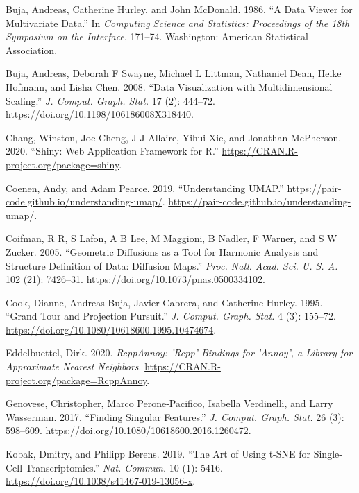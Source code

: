 \documentclass[article,notitle]{jdssv}
\begin{document}
\leavevmode\hypertarget{ref-Buja1986-ku}{}%
Buja, Andreas, Catherine Hurley, and John McDonald. 1986. ``A Data Viewer for Multivariate Data.'' In \emph{Computing Science and Statistics: Proceedings of the 18th Symposium on the Interface}, 171--74. Washington: American Statistical Association.

\leavevmode\hypertarget{ref-Buja2008-fn}{}%
Buja, Andreas, Deborah F Swayne, Michael L Littman, Nathaniel Dean, Heike Hofmann, and Lisha Chen. 2008. ``Data Visualization with Multidimensional Scaling.'' \emph{J. Comput. Graph. Stat.} 17 (2): 444--72. \url{https://doi.org/10.1198/106186008X318440}.

\leavevmode\hypertarget{ref-Chang2020-bq}{}%
Chang, Winston, Joe Cheng, J J Allaire, Yihui Xie, and Jonathan McPherson. 2020. ``Shiny: Web Application Framework for R.'' \url{https://CRAN.R-project.org/package=shiny}.

\leavevmode\hypertarget{ref-Coenen2019-to}{}%
Coenen, Andy, and Adam Pearce. 2019. ``Understanding UMAP.'' \url{https://pair-code.github.io/understanding-umap/}. \url{https://pair-code.github.io/understanding-umap/}.

\leavevmode\hypertarget{ref-Coifman2005-ak}{}%
Coifman, R R, S Lafon, A B Lee, M Maggioni, B Nadler, F Warner, and S W Zucker. 2005. ``Geometric Diffusions as a Tool for Harmonic Analysis and Structure Definition of Data: Diffusion Maps.'' \emph{Proc. Natl. Acad. Sci. U. S. A.} 102 (21): 7426--31. \url{https://doi.org/10.1073/pnas.0500334102}.

\leavevmode\hypertarget{ref-Cook1995-bi}{}%
Cook, Dianne, Andreas Buja, Javier Cabrera, and Catherine Hurley. 1995. ``Grand Tour and Projection Pursuit.'' \emph{J. Comput. Graph. Stat.} 4 (3): 155--72. \url{https://doi.org/10.1080/10618600.1995.10474674}.

\leavevmode\hypertarget{ref-rcpp-annoy-pkg}{}%
Eddelbuettel, Dirk. 2020. \emph{RcppAnnoy: 'Rcpp' Bindings for 'Annoy', a Library for Approximate Nearest Neighbors}. \url{https://CRAN.R-project.org/package=RcppAnnoy}.

\leavevmode\hypertarget{ref-Genovese2017-iq}{}%
Genovese, Christopher, Marco Perone-Pacifico, Isabella Verdinelli, and Larry Wasserman. 2017. ``Finding Singular Features.'' \emph{J. Comput. Graph. Stat.} 26 (3): 598--609. \url{https://doi.org/10.1080/10618600.2016.1260472}.

\leavevmode\hypertarget{ref-Kobak2019-lm}{}%
Kobak, Dmitry, and Philipp Berens. 2019. ``The Art of Using t-SNE for Single-Cell Transcriptomics.'' \emph{Nat. Commun.} 10 (1): 5416. \url{https://doi.org/10.1038/s41467-019-13056-x}.
\end{document}
